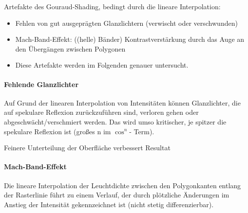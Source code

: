 \documentclass[10pt,landscape]{article}
\begin{document}
\begin{multicols}{3}

Artefakte des Gouraud-Shading, bedingt durch die lineare Interpolation:
\begin{itemize}
  \item Fehlen von gut ausgeprägten Glanzlichtern (verwischt oder verschwunden)
  \item Mach-Band-Effekt: ((helle) Bänder) Kontrastverstärkung durch das Auge an den Übergängen zwischen Polygonen
  \item Diese Artefakte werden im Folgenden genauer untersucht.
\end{itemize}

\paragraph{Fehlende Glanzlichter}
Auf Grund der linearen Interpolation von Intensitäten können Glanzlichter, die auf spekulare Reflexion zurückzuführen sind, verloren gehen oder abgeschwächt/verschmiert werden. Das wird umso kritischer, je spitzer die spekulare Reflexion ist (großes n im $\cos^n$- Term).

Feinere Unterteilung der Oberfläche verbessert Resultat


\paragraph{Mach-Band-Effekt}
Die lineare Interpolation der Leuchtdichte zwischen den Polygonkanten entlang der Rasterlinie führt zu einem Verlauf, der durch plötzliche Änderungen im Anstieg der Intensität gekennzeichnet ist (nicht stetig differenzierbar).


\end{multicols}
\end{document}
